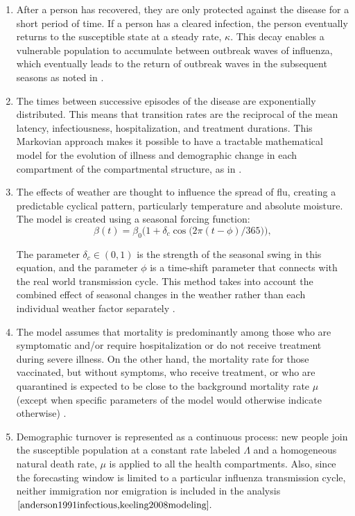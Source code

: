 \documentclass[12pt,a4paper]{article}
\theoremstyle{definition}
\theoremstyle{remark}
\begin{document}
\begin{enumerate}[leftmargin=*]
\item After a person has recovered, they are only protected against the disease for a short period of time. If a person has a cleared infection, the person eventually returns to the susceptible state at a steady rate, $\kappa$. This decay enables a vulnerable population to accumulate between outbreak waves of influenza, which eventually leads to the return of outbreak waves in the subsequent seasons as noted in \cite{woolthuis2017immunity,hill2019seasonal}.



\item The times between successive episodes of the disease are exponentially distributed. This means that transition rates are the reciprocal of the mean latency, infectiousness, hospitalization, and treatment durations. This Markovian approach makes it possible to have a tractable mathematical model for the evolution of illness and demographic change in each compartment of the compartmental structure, as in \cite{anderson1991infectious,keeling2008modeling}.



\item The effects of weather are thought to influence the spread of flu, creating a predictable cyclical pattern, particularly temperature and absolute moisture.
The model is created using a seasonal forcing function:
$$\beta(t)=\beta_0\bigl(1+\delta_c\cos\bigl(2\pi(t-\phi)/365\bigr)\bigr),$$ 

The parameter $\delta_c\in(0,1)$ is the strength of the seasonal swing in this equation, and the parameter $\phi$ is a time-shift parameter that connects with the real world transmission cycle. This method takes into account the combined effect of seasonal changes in the weather rather than each individual weather factor separately \cite{shaman2009humidity, tamerius2011seasonality, yuan2021tropics}.





\item The model assumes that mortality is predominantly among those who are symptomatic and/or require hospitalization or do not receive treatment during severe illness. On the other hand, the mortality rate for those vaccinated, but without symptoms, who receive treatment, or who are quarantined is expected to be close to the background mortality rate $\mu$ (except when specific parameters of the model would otherwise indicate otherwise) \cite{thompson2003mortality, hayden2018baloxavir}.



\item Demographic turnover is represented as a continuous process: new people join the susceptible population at a constant rate labeled $\Lambda$ and a homogeneous natural death rate, $\mu$ is applied to all the health compartments. Also, since the forecasting window is limited to a particular influenza transmission cycle, neither immigration nor emigration is included in the analysis $\cite{anderson1991infectious,keeling2008modeling}.$



\end{enumerate}
\end{document}
